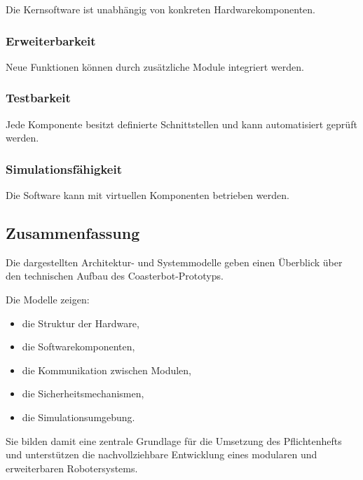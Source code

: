 Die Kernsoftware ist unabhängig von konkreten Hardwarekomponenten.

\subsubsection{Erweiterbarkeit}\label{erweiterbarkeit-2}

Neue Funktionen können durch zusätzliche Module integriert werden.

\subsubsection{Testbarkeit}\label{testbarkeit-1}

Jede Komponente besitzt definierte Schnittstellen und kann automatisiert
geprüft werden.

\subsubsection{Simulationsfähigkeit}\label{simulationsfuxe4higkeit-1}

Die Software kann mit virtuellen Komponenten betrieben werden.

\subsection{Zusammenfassung}\label{zusammenfassung-9}

Die dargestellten Architektur- und Systemmodelle geben einen Überblick
über den technischen Aufbau des Coasterbot-Prototyps.

Die Modelle zeigen:

\begin{itemize}
\tightlist
\item
  die Struktur der Hardware,
\item
  die Softwarekomponenten,
\item
  die Kommunikation zwischen Modulen,
\item
  die Sicherheitsmechanismen,
\item
  die Simulationsumgebung.
\end{itemize}

Sie bilden damit eine zentrale Grundlage für die Umsetzung des
Pflichtenhefts und unterstützen die nachvollziehbare Entwicklung eines
modularen und erweiterbaren Robotersystems.
